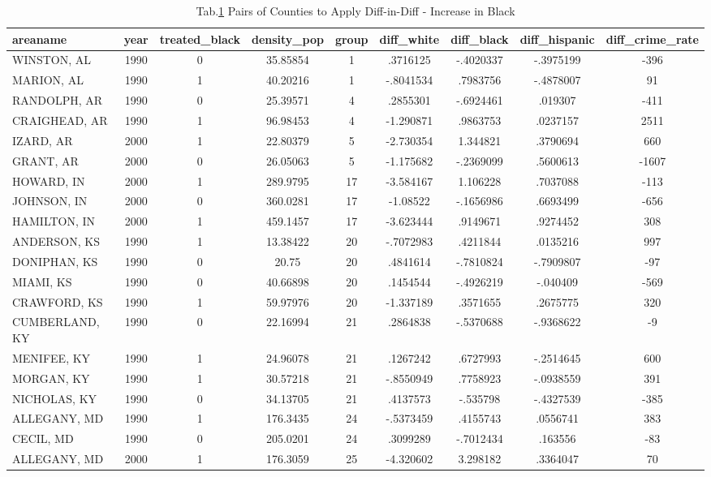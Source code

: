 \documentclass[a4paper,12pt]{article}
\begin{document}
\begin{landscape}
\begin{small}
\begin{center}
\begin{longtable}{lcccccccc}
\caption{Tab.\ref{tab_list_diff_black} Pairs of Counties to Apply Diff-in-Diff  - Increase in Black\label{tab_list_diff_black}}
\hline
areaname&year&treated\_black&density\_pop&group&diff\_white&diff\_black&diff\_hispanic&diff\_crime\_rate \\ \hline
WINSTON, AL&1990&0&35.85854&1&.3716125&-.4020337&-.3975199&-396 \\
MARION, AL&1990&1&40.20216&1&-.8041534&.7983756&-.4878007&91 \\ \hline
RANDOLPH, AR&1990&0&25.39571&4&.2855301&-.6924461&.019307&-411 \\
CRAIGHEAD, AR&1990&1&96.98453&4&-1.290871&.9863753&.0237157&2511 \\ \hline
IZARD, AR&2000&1&22.80379&5&-2.730354&1.344821&.3790694&660 \\
GRANT, AR&2000&0&26.05063&5&-1.175682&-.2369099&.5600613&-1607 \\ \hline
HOWARD, IN&2000&1&289.9795&17&-3.584167&1.106228&.7037088&-113 \\
JOHNSON, IN&2000&0&360.0281&17&-1.08522&-.1656986&.6693499&-656 \\
HAMILTON, IN&2000&1&459.1457&17&-3.623444&.9149671&.9274452&308 \\ \hline
ANDERSON, KS&1990&1&13.38422&20&-.7072983&.4211844&.0135216&997 \\
DONIPHAN, KS&1990&0&20.75&20&.4841614&-.7810824&-.7909807&-97 \\
MIAMI, KS&1990&0&40.66898&20&.1454544&-.4926219&-.040409&-569 \\
CRAWFORD, KS&1990&1&59.97976&20&-1.337189&.3571655&.2675775&320 \\ \hline
CUMBERLAND, KY&1990&0&22.16994&21&.2864838&-.5370688&-.9368622&-9 \\
MENIFEE, KY&1990&1&24.96078&21&.1267242&.6727993&-.2514645&600 \\
MORGAN, KY&1990&1&30.57218&21&-.8550949&.7758923&-.0938559&391 \\
NICHOLAS, KY&1990&0&34.13705&21&.4137573&-.535798&-.4327539&-385 \\ \hline
ALLEGANY, MD&1990&1&176.3435&24&-.5373459&.4155743&.0556741&383 \\
CECIL, MD&1990&0&205.0201&24&.3099289&-.7012434&.163556&-83 \\ \hline
ALLEGANY, MD&2000&1&176.3059&25&-4.320602&3.298182&.3364047&70 \\

\end{longtable}
\end{center}
\end{small}
\end{landscape}
\end{document}
